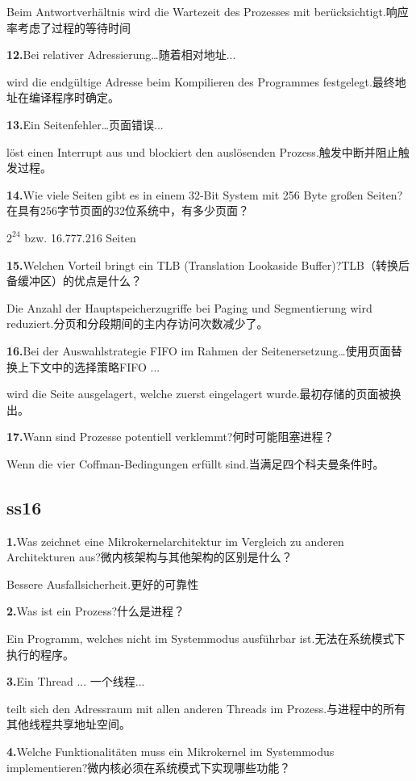 \documentclass[fleqn]{article}
\begin{document}
Beim Antwortverhältnis wird die Wartezeit des Prozesses mit berücksichtigt.响应率考虑了过程的等待时间

\textbf{12.}Bei relativer Adressierung…随着相对地址...

wird die endgültige Adresse beim Kompilieren des Programmes festgelegt.最终地址在编译程序时确定。

\textbf{13.}Ein Seitenfehler…页面错误...

löst einen Interrupt aus und blockiert den auslösenden Prozess.触发中断并阻止触发过程。

\textbf{14.}Wie viele Seiten gibt es in einem 32-Bit System mit 256 Byte großen Seiten?在具有256字节页面的32位系统中，有多少页面？

$2^{24}$ bzw. 16.777.216 Seiten

\textbf{15.}Welchen Vorteil bringt ein TLB (Translation Lookaside Buffer)?TLB（转换后备缓冲区）的优点是什么？

Die Anzahl der Hauptspeicherzugriffe bei Paging und Segmentierung wird reduziert.分页和分段期间的主内存访问次数减少了。

\textbf{16.}Bei der Auswahlstrategie FIFO im Rahmen der Seitenersetzung…使用页面替换上下文中的选择策略FIFO ...

wird die Seite ausgelagert, welche zuerst eingelagert wurde.最初存储的页面被换出。

\textbf{17.}Wann sind Prozesse potentiell verklemmt?何时可能阻塞进程？

Wenn die vier Coffman-Bedingungen erfüllt sind.当满足四个科夫曼条件时。

\subsection{ss16}

\textbf{1.}Was zeichnet eine Mikrokernelarchitektur im Vergleich zu anderen Architekturen aus?微内核架构与其他架构的区别是什么？

Bessere Ausfallsicherheit.更好的可靠性

\textbf{2.}Was ist ein Prozess?什么是进程？

Ein Programm, welches nicht im Systemmodus ausführbar ist.无法在系统模式下执行的程序。

\textbf{3.}Ein Thread ... 一个线程...

teilt sich den Adressraum mit allen anderen Threads im Prozess.与进程中的所有其他线程共享地址空间。

\textbf{4.}Welche Funktionalitäten muss ein Mikrokernel im Systemmodus implementieren?微内核必须在系统模式下实现哪些功能？
\end{document}
